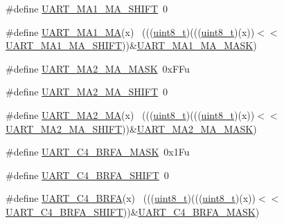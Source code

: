 \begin{DoxyCompactItemize}
\#define \hyperlink{group___u_a_r_t___register___masks_ga878daa0e87ec3da2299c223b6b234976}{U\+A\+R\+T\+\_\+\+M\+A1\+\_\+\+M\+A\+\_\+\+S\+H\+I\+FT}~0
\item 
\#define \hyperlink{group___u_a_r_t___register___masks_ga0f6a921bbc9dffba69c13c0b19b70f49}{U\+A\+R\+T\+\_\+\+M\+A1\+\_\+\+MA}(x)                                                  ~(((\hyperlink{_p_e___types_8h_aba7bc1797add20fe3efdf37ced1182c5}{uint8\+\_\+t})(((\hyperlink{_p_e___types_8h_aba7bc1797add20fe3efdf37ced1182c5}{uint8\+\_\+t})(x))$<$$<$\hyperlink{group___u_a_r_t___register___masks_ga878daa0e87ec3da2299c223b6b234976}{U\+A\+R\+T\+\_\+\+M\+A1\+\_\+\+M\+A\+\_\+\+S\+H\+I\+FT}))\&\hyperlink{group___u_a_r_t___register___masks_gaa4fe1e60d0ca635fd633af77c3b63998}{U\+A\+R\+T\+\_\+\+M\+A1\+\_\+\+M\+A\+\_\+\+M\+A\+SK})
\item 
\#define \hyperlink{group___u_a_r_t___register___masks_ga700f51ab869350daee42b8ae9c655ffd}{U\+A\+R\+T\+\_\+\+M\+A2\+\_\+\+M\+A\+\_\+\+M\+A\+SK}~0x\+F\+Fu
\item 
\#define \hyperlink{group___u_a_r_t___register___masks_ga1ecfe245065ed459b087fc0d629b3f07}{U\+A\+R\+T\+\_\+\+M\+A2\+\_\+\+M\+A\+\_\+\+S\+H\+I\+FT}~0
\item 
\#define \hyperlink{group___u_a_r_t___register___masks_gae9ee9c6d7f090dd59543a468f1493d65}{U\+A\+R\+T\+\_\+\+M\+A2\+\_\+\+MA}(x)                                                  ~(((\hyperlink{_p_e___types_8h_aba7bc1797add20fe3efdf37ced1182c5}{uint8\+\_\+t})(((\hyperlink{_p_e___types_8h_aba7bc1797add20fe3efdf37ced1182c5}{uint8\+\_\+t})(x))$<$$<$\hyperlink{group___u_a_r_t___register___masks_ga1ecfe245065ed459b087fc0d629b3f07}{U\+A\+R\+T\+\_\+\+M\+A2\+\_\+\+M\+A\+\_\+\+S\+H\+I\+FT}))\&\hyperlink{group___u_a_r_t___register___masks_ga700f51ab869350daee42b8ae9c655ffd}{U\+A\+R\+T\+\_\+\+M\+A2\+\_\+\+M\+A\+\_\+\+M\+A\+SK})
\item 
\#define \hyperlink{group___u_a_r_t___register___masks_ga2f0ab4e5358add87747c744f8ba324fb}{U\+A\+R\+T\+\_\+\+C4\+\_\+\+B\+R\+F\+A\+\_\+\+M\+A\+SK}~0x1\+Fu
\item 
\#define \hyperlink{group___u_a_r_t___register___masks_gae8cac47de1cbd8f8bd2cb10133e4f603}{U\+A\+R\+T\+\_\+\+C4\+\_\+\+B\+R\+F\+A\+\_\+\+S\+H\+I\+FT}~0
\item 
\#define \hyperlink{group___u_a_r_t___register___masks_gabb5bd76ed3b85ff1d95199471f59cb7b}{U\+A\+R\+T\+\_\+\+C4\+\_\+\+B\+R\+FA}(x)                                                ~(((\hyperlink{_p_e___types_8h_aba7bc1797add20fe3efdf37ced1182c5}{uint8\+\_\+t})(((\hyperlink{_p_e___types_8h_aba7bc1797add20fe3efdf37ced1182c5}{uint8\+\_\+t})(x))$<$$<$\hyperlink{group___u_a_r_t___register___masks_gae8cac47de1cbd8f8bd2cb10133e4f603}{U\+A\+R\+T\+\_\+\+C4\+\_\+\+B\+R\+F\+A\+\_\+\+S\+H\+I\+FT}))\&\hyperlink{group___u_a_r_t___register___masks_ga2f0ab4e5358add87747c744f8ba324fb}{U\+A\+R\+T\+\_\+\+C4\+\_\+\+B\+R\+F\+A\+\_\+\+M\+A\+SK})
$$
\end{DoxyCompactItemize}
